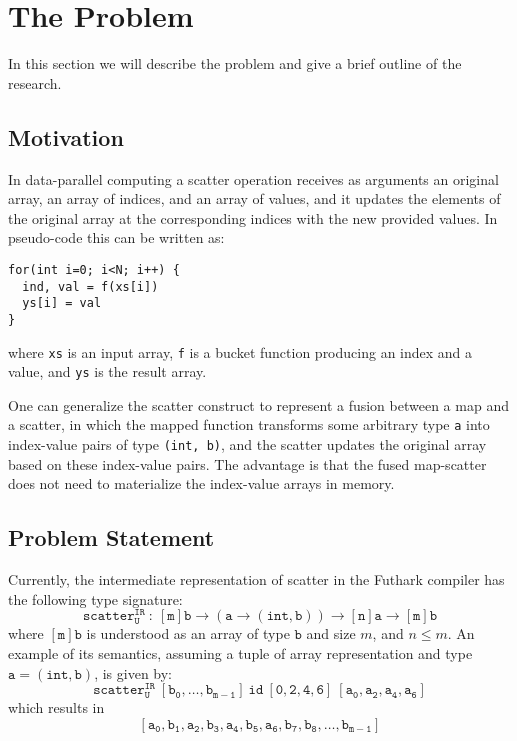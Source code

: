 \chapter{The Problem}
\label{chap:theproblem}

In this section we will describe the problem and give a
brief outline of the research. 


\section{Motivation}

 In data-parallel computing a
scatter operation receives as arguments an original array,
an array of indices, and an array of values, and it updates
the elements of the original array at the corresponding
indices with the new provided values. In pseudo-code this
can be written as:
%
\begin{lstlisting}
for(int i=0; i<N; i++) {
  ind, val = f(xs[i])
  ys[i] = val
}
\end{lstlisting}
%
where \texttt{xs} is an input array, \texttt{f} is a bucket
function producing an index and a value, and \texttt{ys} is
the result array.

One can generalize the scatter construct to
represent a fusion between a map and a scatter, in which the
mapped function transforms some arbitrary type \texttt{a}
into index-value pairs of type \texttt{(int, b)}, and the
scatter updates the original array based on these
index-value pairs. The advantage is that the fused
map-scatter does not need to materialize the index-value
arrays in memory.


\section{Problem Statement}

Currently, the intermediate representation of scatter in the
Futhark compiler has the following type signature:
%
\begin{equation}
  \mathtt{scatter^{IR}_{U}} \ : \
  \mathtt{[m]b} \rightarrow
  \mathtt{(a \rightarrow (int, b))} \rightarrow
  \mathtt{[n]a} \rightarrow
  \mathtt{[m]b}
\end{equation}
%
where $\mathtt{[m]b}$ is understood as an array of type
$\mathtt{b}$ and size $m$, and $n \leq m$. An example of its
semantics, assuming a tuple of array representation and type
$\mathtt{a = (int, b)}$, is given by:
%
\begin{equation}
  \mathtt{scatter^{IR}_{U}} \
  \mathtt{[b_0, \dots, b_{m-1}]} \
  \mathtt{id} \
  \mathtt{[0, 2, 4, 6]} \
  \mathtt{[a_0, a_2 , a_4 ,a_6]}
\end{equation}
%
which results in
%
\begin{equation}
  \mathtt{[a_0, b_1, a_2, b_3, a_4, b_5, a_6, b_7, b_8,
      \dots, b_{m-1}]}
\end{equation}
%

